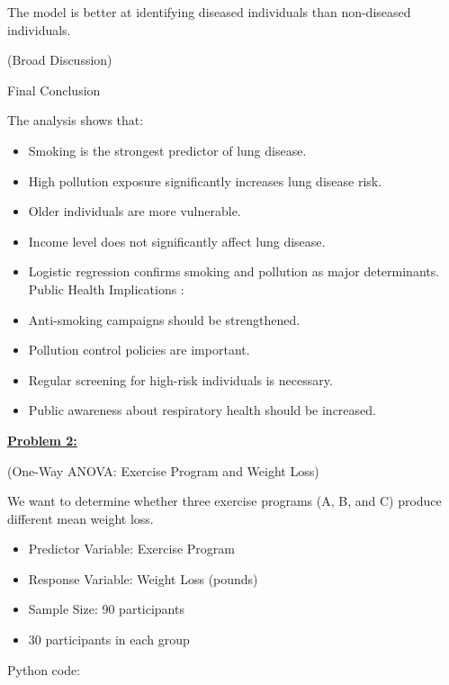 \documentclass[
]{article}
\begin{document}
The model is better at identifying diseased individuals than
non-diseased individuals.

(Broad Discussion)

Final Conclusion

The analysis shows that:

\begin{itemize}
\item
  Smoking is the strongest predictor of lung disease.
\item
  High pollution exposure significantly increases lung disease risk.
\item
  Older individuals are more vulnerable.
\item
  Income level does not significantly affect lung disease.
\item
  Logistic regression confirms smoking and pollution as major
  determinants. Public Health Implications :
\end{itemize}

\begin{itemize}
\item
  Anti-smoking campaigns should be strengthened.
\item
  Pollution control policies are important.
\item
  Regular screening for high-risk individuals is necessary.
\item
  Public awareness about respiratory health should be increased.
\end{itemize}

\textbf{\ul{Problem 2:}}

(One-Way ANOVA: Exercise Program and Weight Loss)

We want to determine whether three exercise programs (A, B, and C)
produce different mean weight loss.

\begin{itemize}
\item
  Predictor Variable: Exercise Program
\item
  Response Variable: Weight Loss (pounds)
\item
  Sample Size: 90 participants
\item
  30 participants in each group
\end{itemize}

Python code:
\end{document}
